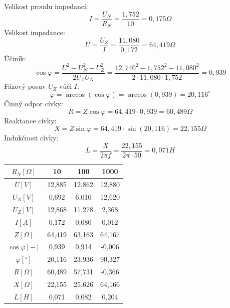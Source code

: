 \documentclass[12pt]{article} %
\begin{document}
Velikost proudu impedancí:
\begin{equation}
I = \frac{U_N}{R_N} = \frac{1,752}{10} = 0,175 \Omega
\end{equation}
Velikost impedance:
\begin{equation}
U = \frac{U_Z}{I} = \frac{11,080}{0,172} = 64,419 \Omega
\end{equation}
Účiník:
\begin{equation}
\cos \varphi = \frac{U^2-U_N^2-U_Z^2}{2U_ZU_N} = \frac{12,740^2-1,752^2-11,080^2}{2\cdot 11,080 \cdot 1,752} = 0,939
\end{equation}
Fázový posuv $U_Z$ vůči $I$:
\begin{equation}
\varphi = \arccos(\cos \varphi) = \arccos(0,939) = 20,116^{\circ}
\end{equation}
Činný odpor cívky:
\begin{equation}
R = Z \cos \varphi = 64,419 \cdot 0,939 = 60,489 \Omega
\end{equation}
Reaktance cívky:
\begin{equation}
X = Z \sin \varphi = 64,419 \cdot \sin(20,116) = 22,155 \Omega
\end{equation}
Indukčnost cívky:
\begin{equation}
L = \frac{X}{2\pi f} = \frac{22,155}{2\pi \cdot 50} = 0,071H
\end{equation}

\begin{tabular}{|c|c|c|c|}
\hline 
$R_N [\Omega]$ & 10 & 100 & 1000 \\ 
\hline 
$U [V]$ & 12,885 & 12,862 & 12,880 \\ 
\hline 
$U_N [V]$ & 0,692 & 6,010 & 12,620 \\ 
\hline 
$U_Z [V]$ & 12,868 & 11,278 & 2,368 \\ 
\hline 
$I [A]$ & 0,172 & 0,080 & 0,012 \\ 
\hline 
$Z [\Omega]$ & 64,419 & 63,163 & 64,167 \\ 
\hline 
$\cos \varphi [-]$ & 0,939 & 0,914 & -0,006 \\ 
\hline 
$\varphi [^{\circ}]$ & 20,116 & 23,936 & 90,327 \\ 
\hline 
$R [\Omega]$ & 60,489 & 57,731 & -0,366 \\ 
\hline 
$X [\Omega]$ & 22,155 & 25,626 & 64,166 \\ 
\hline 
$L [H]$ & 0,071 & 0,082 & 0,204 \\ 
\hline 
\end{tabular} \\\\
\end{document}
